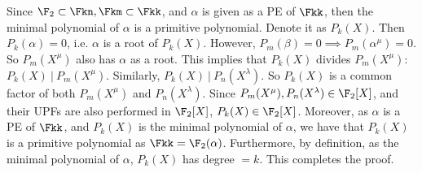 \begin{Proof}
Since $\F_2 \subset \Fkn, \Fkm \subset \Fkk$, and
$\alpha$ is given as a PE of $\Fkk$, then the minimal polynomial of
$\alpha$ is a primitive polynomial. Denote it as $P_k(X)$. Then
$P_k(\alpha)=0$, i.e. $\alpha$ is a root of $P_k(X)$. However,
$P_m(\beta)=0 \implies P_m(\alpha^\mu)=0$. So $P_m(X^\mu)$ also has
$\alpha$ as a root. This implies that $P_k(X)$ divides $P_m(X^\mu)$:
$P_k(X) ~| ~ P_m(X^\mu)$. Similarly, $P_k(X) ~|~ P_n(X^\lambda)$. So
$P_k(X)$ is a common factor of both $P_m(X^\mu)$ and
$P_n(X^\lambda)$. Since $P_m(X^{\mu}), P_n(X^{\lambda}) \in \F_2[X]$,
and their UPFs are also performed in $\F_2[X]$, $P_k(X) \in
\F_2[X]$. Moreover, as $\alpha$ is a PE of $\Fkk$, and $P_k(X)$ is the
minimal polynomial of $\alpha$, we have that $P_k(X)$ is a primitive
polynomial as $\Fkk = \F_2(\alpha)$. Furthermore, by definition, as
the minimal polynomial of $\alpha$, $P_k(X)$ has degree
$=k$. This completes the proof. 
\end{Proof}
